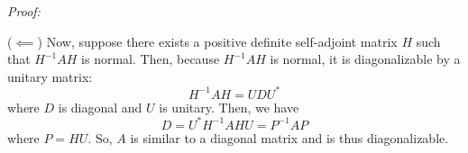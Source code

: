 \documentclass[a4paper,12pt]{article}
\newenvironment{proof}[2][$\square$]
    {\setlength{\parskip}{0pt}\par\textit{Proof:} #2\setlength{\parskip}{0.25cm}
        \savebox{\qed}{#1}
        \begin{adjustwidth}{\widthof{Proof:}}{}
    }
    {
        \hfill\usebox{\qed}\end{adjustwidth}
    }
\begin{document}
\begin{enumerate}[label = (\arabic*)]
\begin{proof}{}
		($ \impliedby $) Now, suppose there exists a positive definite self-adjoint matrix $ H $ such that $ H^{-1} A H $ is normal. Then, because $ H^{-1} A H $ is normal, it is diagonalizable by a unitary matrix:
		\[
			H^{-1} A H = U D U^*
		\]
		where $ D $ is diagonal and $ U $ is unitary. Then, we have
		\[
			D = U^* H^{-1} A H U = P^{-1} A P 
		\]
		where $ P = HU $. So, $ A $ is similar to a diagonal matrix and is thus diagonalizable.
	\end{proof}
\end{enumerate}
\end{document}
